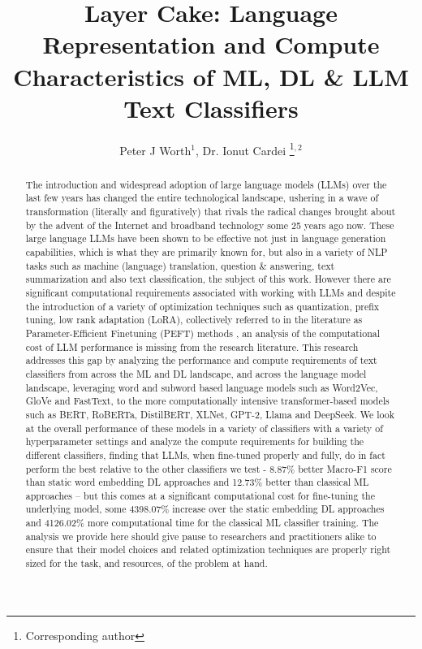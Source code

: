 \documentclass[final]{clv2025}
\begin{document}
\title{Layer Cake: Language Representation and Compute Characteristics of ML, DL \& LLM Text Classifiers}

\author{Peter J Worth$^{1}$, Dr. Ionut Cardei \thanks{Corresponding author}$^{,2}$}


\maketitle

\begin{abstract}
The introduction and widespread adoption of large language models (LLMs) over the last few years has changed the entire technological landscape, ushering in a wave of transformation (literally and figuratively) that rivals the radical changes brought about by the advent of the Internet and broadband technology some 25 years ago now. These large language LLMs have been shown to be effective not just in language generation capabilities, which is what they are primarily known for, but also in a variety of NLP tasks such as machine (language) translation, question \& answering, text summarization and also text classification, the subject of this work. However there are significant computational requirements associated with working with LLMs and despite the introduction of a variety of optimization techniques such as quantization, prefix tuning, low rank adaptation (LoRA), collectively referred to in the literature as Parameter-Efficient Finetuning (PEFT) methods \cite{articleding}, an analysis of the computational cost of LLM performance is missing from the research literature. This research addresses this gap by analyzing the performance and compute requirements of text classifiers from across the ML and DL landscape, and across the language model landscape, leveraging word and subword based language models such as Word2Vec, GloVe and FastText, to the more computationally intensive transformer-based models such as BERT, RoBERTa, DistilBERT, XLNet, GPT-2, Llama and DeepSeek. We look at the overall performance of these models in a variety of classifiers with a variety of hyperparameter settings and analyze the compute requirements for building the different classifiers, finding that LLMs, when fine-tuned properly and fully, do in fact perform the best relative to the other classifiers we test - 8.87\% better Macro-F1 score than static word embedding DL approaches and 12.73\% better than classical ML approaches – but this comes at a significant computational cost for fine-tuning the underlying model, some 4398.07$\%$ increase over the static embedding DL approaches and 4126.02$\%$ more computational time for the classical ML classifier training. The analysis we provide here should give pause to researchers and practitioners alike to ensure that their model choices and related optimization techniques are properly right sized for the task, and resources, of the problem at hand. 
\end{abstract}
\end{document}
